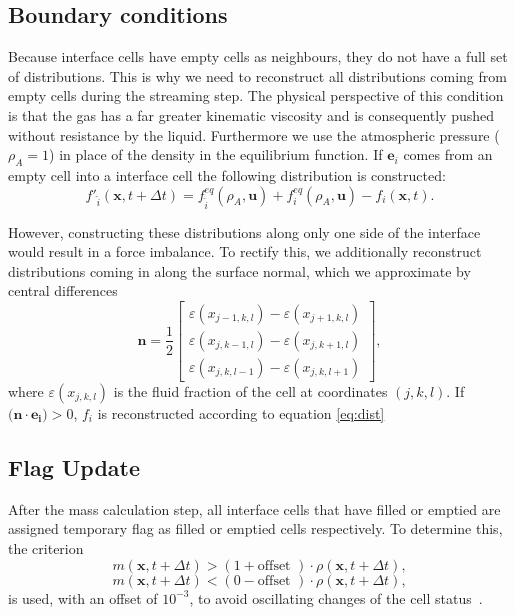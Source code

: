 \documentclass[10pt,a4paper,notitlepage]{article}
\begin{document}
\subsection{Boundary conditions}
Because interface cells have empty cells as neighbours, they do not have a full set of distributions.
This is why we need to reconstruct all distributions coming from empty cells during the streaming step.
The physical perspective of this condition is that the gas has a far greater kinematic viscosity and is consequently pushed without resistance by the liquid.
Furthermore we use the atmospheric pressure ($\rho_{A} = 1$) in place of the density in the equilibrium function.
If $\bm{e}_{i}$ comes from an empty cell into a interface cell the following distribution is constructed:
\begin{equation} \label{eq:dist}
f'_{\hat{i}} (\bm{x}, t + \Delta t) = f^{eq}_{\hat{i}}(\rho_A, \mathbf{u})+f^{eq}_{{i}}(\rho_A, \mathbf{u})-f_{i}(\mathbf{x},t).
\end{equation}

However, constructing these distributions along only one side of the interface would result in a force imbalance.
To rectify this, we additionally reconstruct distributions coming in along the surface normal, which we approximate by central differences
\begin{equation} \label{eq:normal}
  \mathbf{n}=\frac{1}{2}\begin{bmatrix} \varepsilon(x_{j-1,k,l})-\varepsilon(x_{j+1,k,l})\\\varepsilon(x_{j,k-1,l})-\varepsilon(x_{j,k+1,l})
    \\
    \varepsilon(x_{j,k,l-1})-\varepsilon(x_{j,k,l+1} ) \end{bmatrix},
\end{equation}
where $\varepsilon(x_{j,k,l})$ is the fluid fraction of the cell at coordinates $(j,k,l)$.
If $\mathbf(\bm{n} \cdot \bm{e_i})>0$, $f_{i}$ is reconstructed according to equation \eqref{eq:dist}


\subsection{Flag Update}
After the mass calculation step, all interface cells that have filled or emptied are assigned temporary flag as filled or emptied cells respectively.
To determine this, the criterion
\begin{equation} \label{eq:filled}
m(\bm{x},t+ \Delta t)>(1+ \text{offset }) \cdot \rho(\bm{x},t+\Delta t),
\end{equation}
\begin{equation} \label{eq:empty}
m(\bm{x},t+ \Delta t)<(0- \text{offset }) \cdot \rho(\bm{x},t+\Delta t),
\end{equation}
is used, with an offset of $10^{-3}$, to avoid oscillating changes of the cell status~\cite{thurey2007physically}.
\end{document}
